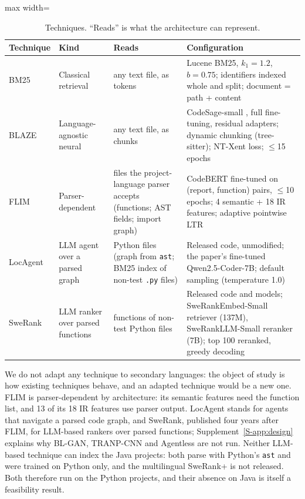 \documentclass[a4paper,fleqn]{cas-dc}
\begin{document}
\begin{table}[t]
\caption{Techniques. ``Reads'' is what the architecture can represent.}
\label{tab:techniques}
\small
\begin{adjustbox}{max width=\linewidth}\begin{tabular}{p{2.0cm}p{3.2cm}p{4.6cm}p{6.2cm}}
\toprule
Technique & Kind & Reads & Configuration \\
\midrule
BM25 & Classical retrieval & any text file, as tokens & Lucene BM25, $k_1{=}1.2$, $b{=}0.75$; identifiers indexed whole and split; document = path + content \\
BLAZE \citep{chakraborty2025blaze} & Language-agnostic neural & any text file, as chunks & CodeSage-small \citep{zhang2024codesage}, full fine-tuning, residual adapters; dynamic chunking (tree-sitter); NT-Xent loss; $\le$15 epochs \\
FLIM \citep{liang2022modeling} & Parser-dependent & files the project-language parser accepts (functions; AST fields; import graph) & CodeBERT fine-tuned on (report, function) pairs, $\le$10 epochs; 4 semantic + 18 IR features; adaptive pointwise LTR \citep{fejzer2022tracking} \\
LocAgent \citep{chen2025locagent} & LLM agent over a parsed graph & Python files (graph from \texttt{ast}; BM25 index of non-test \texttt{.py} files) & Released code, unmodified; the paper's fine-tuned Qwen2.5-Coder-7B; default sampling (temperature 1.0) \\
SweRank \citep{reddy2025swerank} & LLM ranker over parsed functions & functions of non-test Python files & Released code and models; SweRankEmbed-Small retriever (137M), SweRankLLM-Small reranker (7B); top 100 reranked, greedy decoding \\
\bottomrule
\end{tabular}\end{adjustbox}
\end{table}

We do not adapt any technique to secondary languages: the object of study is
how existing techniques behave, and an adapted technique would be a new one.
FLIM is parser-dependent by architecture: its semantic features need the
function list, and 13 of its 18 IR features use parser output. LocAgent
stands for agents that navigate a parsed code graph, and SweRank, published
four years after FLIM, for LLM-based rankers over parsed functions; Supplement~\ref{S-app:design} explains why BL-GAN, TRANP-CNN and
Agentless are not run. Neither LLM-based technique can index the Java
projects: both parse with Python's \texttt{ast} and were trained on Python
only, and the multilingual SweRank+ is not released. Both therefore run on the
Python projects, and their absence on Java is itself a feasibility result.
\end{document}
